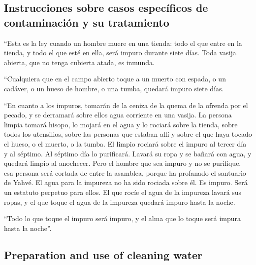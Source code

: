 \begin{paracol}{2}
\hypertarget{instrucciones-sobre-casos-especuxedficos-de-contaminaciuxf3n-y-su-tratamiento}{%
\subsection{Instrucciones sobre casos específicos de contaminación y su
tratamiento}\label{instrucciones-sobre-casos-especuxedficos-de-contaminaciuxf3n-y-su-tratamiento}}

 ``Esta es la ley cuando un hombre muere en una tienda:
todo el que entre en la tienda, y todo el que esté en ella, será impuro
durante siete días.  Toda vasija abierta, que no tenga
cubierta atada, es inmunda.

 ``Cualquiera que en el campo abierto toque a un muerto
con espada, o un cadáver, o un hueso de hombre, o una tumba, quedará
impuro siete días.

 ``En cuanto a los impuros, tomarán de la ceniza de la
quema de la ofrenda por el pecado, y se derramará sobre ellos agua
corriente en una vasija.  La persona limpia tomará
hisopo, lo mojará en el agua y lo rociará sobre la tienda, sobre todos
los utensilios, sobre las personas que estaban allí y sobre el que haya
tocado el hueso, o el muerto, o la tumba.  El limpio
rociará sobre el impuro al tercer día y al séptimo. Al séptimo día lo
purificará. Lavará su ropa y se bañará con agua, y quedará limpio al
anochecer.  Pero el hombre que sea impuro y no se
purifique, esa persona será cortada de entre la asamblea, porque ha
profanado el santuario de Yahvé. El agua para la impureza no ha sido
rociada sobre él. Es impuro.  Será un estatuto perpetuo
para ellos. El que rocíe el agua de la impureza lavará sus ropas, y el
que toque el agua de la impureza quedará impuro hasta la noche.

 ``Todo lo que toque el impuro será impuro, y el alma que
lo toque será impura hasta la noche''.

\switchcolumn
\begin{otherlanguage}{english}

\hypertarget{preparation-and-use-of-cleaning-water}{%
\subsection{Preparation and use of cleaning
water}\label{preparation-and-use-of-cleaning-water}}

\hypertarget{section-37}{%
}
\end{otherlanguage}
\end{paracol}
